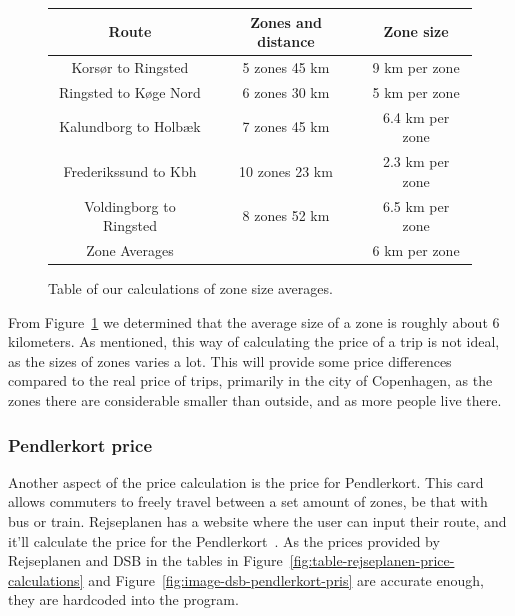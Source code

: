 \begin{figure}[H]
    \centering
    \noindent
    \begin{tabular}{ || c | c | c || }
        \hline
        Route & Zones and distance & Zone size \\
        \hline\hline
        Korsør to Ringsted & 5 zones 45 km & 9 km per zone \\
        \hline
        Ringsted to Køge Nord & 6 zones 30 km & 5 km per zone \\
        \hline
        Kalundborg to Holbæk & 7 zones 45 km & 6.4 km per zone \\
        \hline
        Frederikssund to Kbh & 10 zones 23 km & 2.3 km per zone \\
        \hline
        Voldingborg to Ringsted & 8 zones 52 km & 6.5 km per zone \\
        \hline\hline
        Zone Averages & & 6 km per zone \\
        \hline
    \end{tabular}
    \caption{Table of our calculations of zone size averages.}
    \label{fig:table-zone-size-averages}
\end{figure}

From Figure~\ref{fig:table-zone-size-averages} we determined that the average size of a zone is roughly about 6
kilometers.
As mentioned, this way of calculating the price of a trip is not ideal, as the sizes of zones varies a lot.
This will provide some price differences compared to the real price of trips, primarily in the city of Copenhagen,
as the zones there are considerable smaller than outside, and as more people live there.

\subsubsection{Pendlerkort price}

Another aspect of the price calculation is the price for Pendlerkort.
This card allows commuters to freely travel between a set amount of zones, be that with bus or train.
Rejseplanen has a website where the user can input their route, and it'll calculate the price for the
Pendlerkort~\cite{price_calculator}.
As the prices provided by Rejseplanen and DSB in the tables in Figure~\ref{fig:table-rejseplanen-price-calculations} and
Figure~\ref{fig:image-dsb-pendlerkort-pris} are accurate enough, they are hardcoded into the program.

